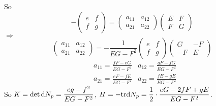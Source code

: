 So 
\[-\begin{pmatrix}
    e&f\\
    f&g 
\end{pmatrix}=\begin{pmatrix}
    a_{11}&a_{12}\\
    a_{21}&a_{22}   
\end{pmatrix}\begin{pmatrix}
    E&F\\
    F&G
\end{pmatrix}\]
 $ \Rightarrow  $ 
\begin{equation}
    \begin{pmatrix}
        a_{11}&a_{12}\\
        a_{21}&a_{22}
    \end{pmatrix}=-\frac{1}{EG-F^2}\begin{pmatrix}
        e&f\\
        f&g
    \end{pmatrix}\begin{pmatrix}
        G&-F\\
        -F&E
    \end{pmatrix}
\end{equation} 
\ie 
\begin{equation}
    \begin{aligned}
        &a_{11}=\frac{fF-eG}{EG-F^2}&a_{12}=\frac{gF-fG}{EG-F^2}\\
        &a_{21}=\frac{eF-fE}{EG-F^2}&a_{22}=\frac{fE-gE}{EG-F^2}
    \end{aligned}
\end{equation}
So  $ K=\det \mathrm{d} N_p=\displaystyle\frac{eg-f^2}{EG-F^2} $,  $ H=-\mathrm{tr} \mathrm{d} N_p=\displaystyle\frac{1}{2}\cdot\frac{eG-2fF+gE}{EG-F^2}$. 


